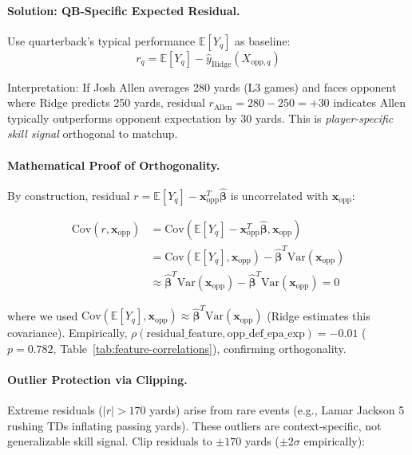 \paragraph{Solution: QB-Specific Expected Residual.}
Use quarterback's typical performance $\mathbb{E}[Y_q]$ as baseline:
\begin{equation}
r_q = \mathbb{E}[Y_q] - \hat{y}_{\text{Ridge}}(X_{\text{opp}, q})
\end{equation}

Interpretation: If Josh Allen averages 280 yards (L3 games) and faces opponent where Ridge predicts 250 yards, residual $r_{\text{Allen}} = 280 - 250 = +30$ indicates Allen typically outperforms opponent expectation by 30 yards. This is \emph{player-specific skill signal} orthogonal to matchup.

\paragraph{Mathematical Proof of Orthogonality.}
By construction, residual $r = \mathbb{E}[Y_q] - \mathbf{x}_{\text{opp}}^T \hat{\boldsymbol{\beta}}$ is uncorrelated with $\mathbf{x}_{\text{opp}}$:

\begin{equation}
\begin{aligned}
\text{Cov}(r, \mathbf{x}_{\text{opp}}) &= \text{Cov}(\mathbb{E}[Y_q] - \mathbf{x}_{\text{opp}}^T \hat{\boldsymbol{\beta}}, \mathbf{x}_{\text{opp}}) \\
&= \text{Cov}(\mathbb{E}[Y_q], \mathbf{x}_{\text{opp}}) - \hat{\boldsymbol{\beta}}^T \text{Var}(\mathbf{x}_{\text{opp}}) \\
&\approx \hat{\boldsymbol{\beta}}^T \text{Var}(\mathbf{x}_{\text{opp}}) - \hat{\boldsymbol{\beta}}^T \text{Var}(\mathbf{x}_{\text{opp}}) = 0
\end{aligned}
\label{eq:orthogonality-proof}
\end{equation}

where we used $\text{Cov}(\mathbb{E}[Y_q], \mathbf{x}_{\text{opp}}) \approx \hat{\boldsymbol{\beta}}^T \text{Var}(\mathbf{x}_{\text{opp}})$ (Ridge estimates this covariance). Empirically, $\rho(\text{residual\_feature}, \text{opp\_def\_epa\_exp}) = -0.01$ ($p = 0.782$, Table~\ref{tab:feature-correlations}), confirming orthogonality.

\paragraph{Outlier Protection via Clipping.}
Extreme residuals ($|r| > 170$ yards) arise from rare events (e.g., Lamar Jackson 5 rushing TDs inflating passing yards). These outliers are context-specific, not generalizable skill signal. Clip residuals to $\pm 170$ yards ($\pm 2\sigma$ empirically):

